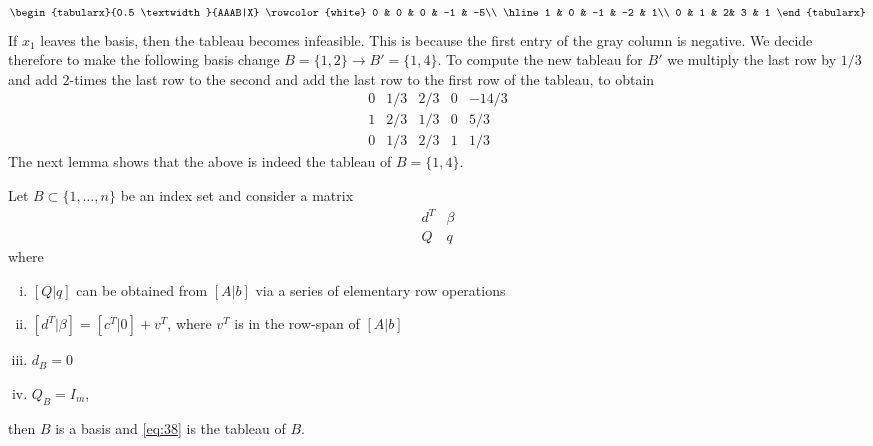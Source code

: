 \begin{equation}
\label{eq:45}
  \begin{tabularx}{0.5 \textwidth}{AAAB|X}
\rowcolor{white}    0   &      0 &     0  &    -1   &   -5\\ \hline 
    1   &    0  &    -1  &    -2 &      1\\
    0 &     1 &     2&     3  &     1
  \end{tabularx}
\end{equation}
If $x_1$ leaves the basis, then the tableau becomes infeasible. This
is because the first entry of the gray column is negative.  We decide
therefore to make the following basis change $B = \{1,2\} \to B' =\{ 1, 4\}$. To
compute the new tableau for $B'$ we multiply the last row by $1/3$ 
and  add $2$-times the last row to the second
and add the last row to the first row of the tableau, to obtain 
\begin{equation}
  \label{eq:39}
  \begin{array}{cccc|c}
       0&   1/3&   2/3&     0& -14/3 \\ \hline
       1&    2/3&   1/3&     0&   5/3\\
     0&   1/3&   2/3&     1&   1/3
   \end{array}
 \end{equation}
%
The next lemma shows that the above is indeed the tableau of $B = \{1,4\}$.
\begin{lemma}
  \label{lem:13}
  Let $B\subset\{1,\ldots,n\}$ be an index set %
and    consider a matrix 
  \begin{equation}
    \label{eq:38}
    \begin{array}{c|c}
      d^T & \beta \\ \hline 
      Q & q 
    \end{array}
  \end{equation}
  where 
  \begin{enumerate}[i)]
  \item $[Q|q]$ can be obtained from $[A|b]$ via a series
      of elementary row operations 
  \item $[d^T|\beta] = [c^T | 0] + v^T$, where $v^T$ is in the row-span
    of $[A|b]$ 
  \item $d_B=0$ 
  \item $Q_B = I_m$,
  \end{enumerate}
  then $B$ is a basis and \eqref{eq:38} is the tableau of $B$.
\end{lemma}



